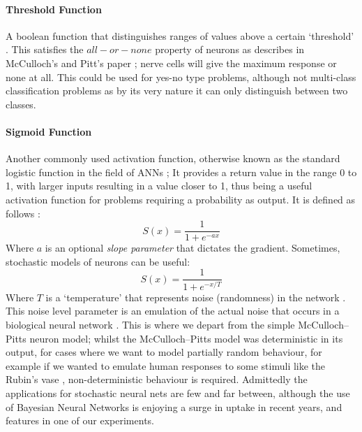 \documentclass[12pt]{article}
\begin{document}
\paragraph{Threshold Function} A boolean function that distinguishes ranges of values above a certain `threshold' \autocite{dodge2003the}. This satisfies the $all-or-none$ property of neurons as describes in McCulloch's and Pitt's paper \autocite{mcculloch1943logical}; nerve cells will give the maximum response or none at all. This could be used for yes-no type problems, although not multi-class classification problems as by its very nature it can only distinguish between two classes. 
\paragraph{Sigmoid Function} Another commonly used activation function, otherwise known as the standard logistic function in the field of ANNs \autocite{10.1007/3-540-59497-3_175}; It provides a return value in the range 0 to 1, with larger inputs resulting in a value closer to 1, thus being a useful activation function for problems requiring a probability as output. It is defined as follows \autocite{10.1007/3-540-59497-3_175}:
\begin{equation}
    S(x) = \frac{1}{1+e^{-ax}}
\end{equation}
Where $a$ is an optional \textit{slope parameter} that dictates the gradient. Sometimes, stochastic models of neurons can be useful:
\begin{equation}
    S(x) = \frac{1}{1+e^{-x/T}}
\end{equation}
Where $T$ is a `temperature' that represents noise (randomness) in the network \autocite{haykin2010neural, Keeler1712}. This noise level parameter is an emulation of the actual noise that occurs in a biological neural network \autocite{Keeler1712}. This is where we depart from the simple McCulloch–Pitts neuron model;  whilst the McCulloch–Pitts model was deterministic in its output, for cases where we want to model partially random behaviour, for example if we wanted to emulate human responses to some stimuli like the Rubin's vase \autocite{rubin1915synsoplevede}, non-deterministic behaviour is required. Admittedly the applications for stochastic neural nets are few and far between, although the use of Bayesian Neural Networks is enjoying a surge in uptake in recent years, and features in one of our experiments.
\\
\end{document}
